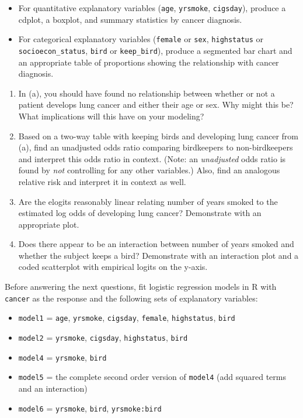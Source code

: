 \documentclass[
]{krantz}
\providecommand{\tightlist}{%
  \setlength{\itemsep}{0pt}\setlength{\parskip}{0pt}}
\begin{document}
\begin{enumerate}
  \begin{itemize}
  \item
    For quantitative explanatory variables (\texttt{age}, \texttt{yrsmoke}, \texttt{cigsday}), produce a cdplot, a boxplot, and summary statistics by cancer diagnosis.
  \item
    For categorical explanatory variables (\texttt{female} or \texttt{sex}, \texttt{highstatus} or \texttt{socioecon\_status}, \texttt{bird} or \texttt{keep\_bird}), produce a segmented bar chart and an appropriate table of proportions showing the relationship with cancer diagnosis.
  \end{itemize}

  \begin{enumerate}
  \def\labelenumii{\alph{enumii}.}
  \setcounter{enumii}{1}
  \item
    In (a), you should have found no relationship between whether or not a patient develops lung cancer and either their age or sex. Why might this be? What implications will this have on your modeling?
  \item
    Based on a two-way table with keeping birds and developing lung cancer from (a), find an unadjusted odds ratio comparing birdkeepers to non-birdkeepers and interpret this odds ratio in context. (Note: an \emph{unadjusted} odds ratio is found by \emph{not} controlling for any other variables.) Also, find an analogous relative risk and interpret it in context as well.
  \item
    Are the elogits reasonably linear relating number of years smoked to the estimated log odds of developing lung cancer? Demonstrate with an appropriate plot.
  \item
    Does there appear to be an interaction between number of years smoked and whether the subject keeps a bird? Demonstrate with an interaction plot and a coded scatterplot with empirical logits on the y-axis.
  \end{enumerate}

  Before answering the next questions, fit logistic regression models in R with \texttt{cancer} as the response and the following sets of explanatory variables:

  \begin{itemize}
  \tightlist
  \item
    \texttt{model1} = \texttt{age}, \texttt{yrsmoke}, \texttt{cigsday}, \texttt{female}, \texttt{highstatus}, \texttt{bird}
  \item
    \texttt{model2} = \texttt{yrsmoke}, \texttt{cigsday}, \texttt{highstatus}, \texttt{bird}
  \item
    \texttt{model4} = \texttt{yrsmoke}, \texttt{bird}
  \item
    \texttt{model5} = the complete second order version of \texttt{model4} (add squared terms and an interaction)
  \item
    \texttt{model6} = \texttt{yrsmoke}, \texttt{bird}, \texttt{yrsmoke:bird}
  \end{itemize}


\end{enumerate}
\end{document}
